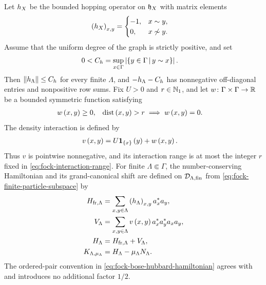 \documentclass[11pt,a4paper]{article}
\theoremstyle{plain}
\theoremstyle{definition}
\theoremstyle{remark}
\begin{document}
Let \(\physham[h]_{X}\) be the bounded hopping operator on \(\sphilbfrak{h}_{X}\) with matrix elements \[\begin{aligned}
\rbk{\physham[h]_{X}}_{x,y}
& =
\begin{cases}
-1,
& x \sim y,
\\
0,
& x \not\sim y.
\end{cases}
\end{aligned}\] Assume that the uniform degree of the graph is strictly positive, and set \begin{equation}
\begin{aligned}
0<C_h
& =
\sup_{x \in \Gamma}\left| \left\{y \in \Gamma \, \middle| \, y \sim x\right\} \right|.
\end{aligned}
\label{eq:fock-uniform-degree-bound}
\end{equation} Then \(\norm{\physham[h]_{\Lambda}} \leq C_h\) for every finite \(\Lambda\), and \(-\physham[h]_{\Lambda} - C_h\) has nonnegative off-diagonal entries and nonpositive row sums. Fix \(U > 0\) and \(r\in\mathbb{N}_1\), and let \(w \colon \Gamma \times \Gamma \to \mathbb{R}\) be a bounded symmetric function satisfying \begin{equation}
\begin{aligned}
w \left( x,y \right)
& \geq
0,
&
\operatorname{dist} \left( x,y \right)>r
& \implies
w \left( x,y \right)=0.
\end{aligned}
\label{eq:fock-interaction-range}
\end{equation} The density interaction is defined by \[\begin{aligned}
v \left( x,y \right)
& =
U\boldsymbol{1}_{\left\{ x \right\}} \left( y \right) + w \left( x,y \right).
\end{aligned}\] Thus \(v\) is pointwise nonnegative, and its interaction range is at most the integer \(r\) fixed in \eqref{eq:fock-interaction-range}. For finite \(\Lambda \Subset \Gamma\), the number-conserving Hamiltonian and its grand-canonical shift are defined on \(\sphilb{D}_{\Lambda,\txtfin}\) from \eqref{eq:fock-finite-particle-subspace} by \begin{equation}
\begin{aligned}
\physham_{\txtfr,\Lambda}
& =
\sum_{x,y \in \Lambda}
\rbk{\physham[h]_{\Lambda}}_{x,y}\faadj{a_x} a_y,
\\
V_{\Lambda}
& =
\sum_{x,y \in \Lambda}
\fun{v}{x,y}\faadj{a_x}\faadj{a_y} a_x a_y,
\\
H_{\Lambda}
& =
\physham_{\txtfr,\Lambda} + V_{\Lambda},
\\
K_{\Lambda,\smchemicalpotential_{\Lambda}}
& =
H_{\Lambda} - \smchemicalpotential_{\Lambda}\opfocknumber_{\Lambda}.
\end{aligned}
\label{eq:fock-bose-hubbard-hamiltonian}
\end{equation} The ordered-pair convention in \eqref{eq:fock-bose-hubbard-hamiltonian} agrees with \cite[equation (10)]{DeuchertLampartLemm001} and introduces no additional factor \(1/2\).
\end{document}
